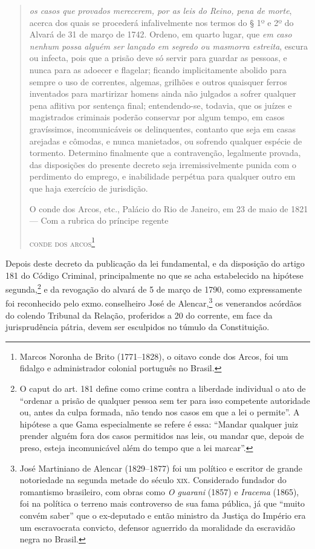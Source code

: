 \begin{quote}
\emph{os casos que provados merecerem, por as leis do Reino, pena de
morte}, acerca dos quais se procederá infalivelmente nos termos do § 1º
e 2º do Alvará de 31 de março de 1742. Ordeno, em quarto lugar, que
\emph{em caso nenhum possa alguém ser lançado em segredo ou masmorra
estreita}, escura ou infecta, pois que a prisão deve só servir para
guardar as pessoas, e nunca para as adoecer e flagelar; ficando
implicitamente abolido para sempre o uso de correntes, algemas, grilhões
e outros quaisquer ferros inventados para martirizar homens ainda não
julgados a sofrer qualquer pena aflitiva por sentença final;
entendendo-se, todavia, que os juízes e magistrados criminais poderão
conservar por algum tempo, em casos gravíssimos, incomunicáveis os
delinquentes, contanto que seja em casas arejadas e cômodas, e nunca
manietados, ou sofrendo qualquer espécie de tormento. Determino
finalmente que a contravenção, legalmente provada, das disposições do
presente decreto seja irremissivelmente punida com o perdimento do
emprego, e inabilidade perpétua para qualquer outro em que haja
exercício de jurisdição.\medskip

\hfill\parbox{220pt}{O conde dos Arcos, etc., Palácio do Rio de Janeiro, em 23 de maio de
1821 --- Com a rubrica do príncipe regente}

\hfill\textsc{conde dos arcos}\footnote{Marcos Noronha de Brito (1771--1828), o
  oitavo conde dos Arcos, foi um fidalgo e administrador colonial
  português no Brasil.}
\end{quote}

Depois deste decreto da publicação da lei fundamental, e da disposição
do artigo 181 do Código Criminal, principalmente no que se acha
estabelecido na hipótese segunda,\footnote{O caput do art. 181
  define como crime contra a liberdade individual o ato de ``ordenar a
  prisão de qualquer pessoa sem ter para isso competente autoridade ou,
  antes da culpa formada, não tendo nos casos em que a lei o permite''. A
  hipótese a que Gama especialmente se refere é essa: ``Mandar qualquer
  juiz prender alguém fora dos casos permitidos nas leis, ou mandar que,
  depois de preso, esteja incomunicável além do tempo que a lei marcar''.}
e da revogação do alvará de 5 de março de 1790, como expressamente foi
reconhecido pelo exmo.\,conselheiro José de Alencar,\footnote{José
  Martiniano de Alencar (1829--1877) foi um político e escritor de grande
  notoriedade na segunda metade do século \textsc{xix}. Considerado fundador do
  romantismo brasileiro, com obras como \emph{O guarani} (1857) e
  \emph{Iracema} (1865), foi na política o terreno mais controverso de
  sua fama pública, já que ``muito convém saber'' que o ex-deputado e
  então ministro da Justiça do Império era um escravocrata convicto,
  defensor aguerrido da moralidade da escravidão negra no Brasil.}
os venerandos acórdãos do
colendo Tribunal da Relação, proferidos a 20 do corrente, em face da
jurisprudência pátria, devem ser esculpidos no túmulo da Constituição.\medskip


